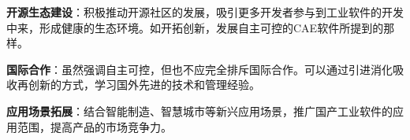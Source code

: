 \documentclass[UTF8,a4paper]{ctexart}
\begin{document}
	\textbf{开源生态建设}：积极推动开源社区的发展，吸引更多开发者参与到工业软件的开发中来，形成健康的生态环境。如开拓创新，发展自主可控的CAE软件所提到的那样。
	
	\textbf{国际合作}：虽然强调自主可控，但也不应完全排斥国际合作。可以通过引进消化吸收再创新的方式，学习国外先进的技术和管理经验。
	
	\textbf{应用场景拓展}：结合智能制造、智慧城市等新兴应用场景，推广国产工业软件的应用范围，提高产品的市场竞争力。
	\newpage





	
	



\end{document}
